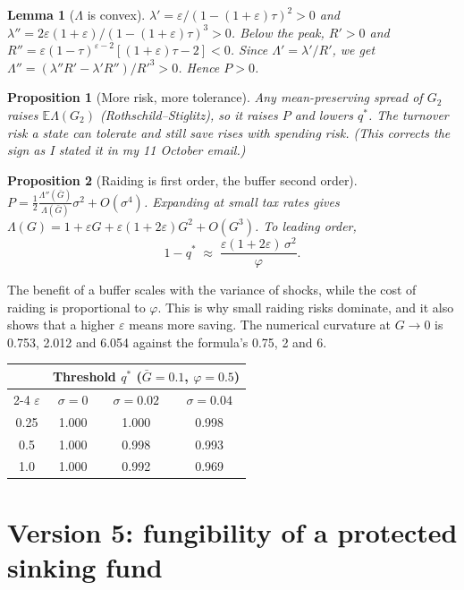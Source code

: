 \documentclass[11pt]{article}
\newtheorem{proposition}{Proposition}
\newtheorem{lemma}{Lemma}
\newcommand{\E}{\mathbb{E}}
\begin{document}
\begin{lemma}[$\Lambda$ is convex]
$\lambda'=\varepsilon/(1-(1+\varepsilon)\tau)^2>0$ and $\lambda''=2\varepsilon(1+\varepsilon)/(1-(1+\varepsilon)\tau)^3>0$. Below the peak, $R'>0$ and $R''=\varepsilon(1-\tau)^{\varepsilon-2}[(1+\varepsilon)\tau-2]<0$. Since $\Lambda'=\lambda'/R'$, we get $\Lambda''=(\lambda''R'-\lambda'R'')/R'^3>0$. Hence $P>0$.
\end{lemma}

\begin{proposition}[More risk, more tolerance]
Any mean-preserving spread of $G_2$ raises $\E\Lambda(G_2)$ (Rothschild--Stiglitz), so it raises $P$ and lowers $q^*$. The turnover risk a state can tolerate and still save rises with spending risk. (This corrects the sign as I stated it in my 11 October email.)
\end{proposition}

\begin{proposition}[Raiding is first order, the buffer second order]
$P=\tfrac12\frac{\Lambda''(\bar G)}{\Lambda(\bar G)}\sigma^2+O(\sigma^4)$. Expanding at small tax rates gives $\Lambda(G)=1+\varepsilon G+\varepsilon(1+2\varepsilon)G^2+O(G^3)$. To leading order,
\[
1-q^*\;\approx\;\frac{\varepsilon(1+2\varepsilon)\,\sigma^2}{\varphi}.
\]
\end{proposition}
The benefit of a buffer scales with the variance of shocks, while the cost of raiding is proportional to $\varphi$. This is why small raiding risks dominate, and it also shows that a higher $\varepsilon$ means more saving. The numerical curvature at $G\to0$ is 0.753, 2.012 and 6.054 against the formula's 0.75, 2 and 6.

\begin{center}
\begin{tabular}{cccc}
\toprule
& \multicolumn{3}{c}{Threshold $q^*$ ($\bar G=0.1$, $\varphi=0.5$)}\\
\cmidrule(l){2-4}
$\varepsilon$ & $\sigma=0$ & $\sigma=0.02$ & $\sigma=0.04$\\
\midrule
0.25 & 1.000 & 1.000 & 0.998\\
0.5 & 1.000 & 0.998 & 0.993\\
1.0 & 1.000 & 0.992 & 0.969\\
\bottomrule
\end{tabular}
\end{center}

\section{Version 5: fungibility of a protected sinking fund}
\end{document}
